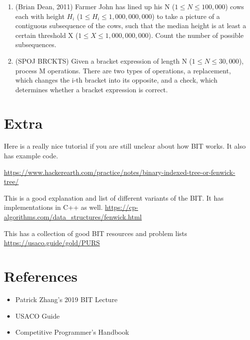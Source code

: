 \documentclass{article}
\begin{document}
\begin{enumerate}
    \item (Brian Dean, 2011) Farmer John has lined up his N ($1 \leq N \leq 100,000$) cows each with height $H_i$ ($1 \leq H_i \leq
1,000,000,000$) to take a picture of a contiguous subsequence of the cows, such that the median height is at
least a certain threshold X ($1 \leq X \leq 1,000,000,000$). Count the number of possible subsequences.

    \item (SPOJ BRCKTS) Given a bracket expression of length N ($1 \leq N \leq 30,000$), process M operations. There are
two types of operations, a replacement, which changes the i-th bracket into its opposite, and a check, which
determines whether a bracket expression is correct.
\end{enumerate} 
        
        
\section{Extra}
Here is a really nice tutorial if you are still unclear about how BIT works. It also has example code.

\noindent\url{https://www.hackerearth.com/practice/notes/binary-indexed-tree-or-fenwick-tree/}

\vspace{5pt}\noindent This is a good explanation and list of different variants of the BIT. It has implementations in C++ as well.
\url{https://cp-algorithms.com/data_structures/fenwick.html}

\vspace{5pt}\noindent This has a collection of good BIT resources and problem lists
\newline\noindent\url{https://usaco.guide/gold/PURS}
\section{References}

\begin{itemize}
    \item Patrick Zhang's 2019 BIT Lecture
    \item USACO Guide
    \item Competitive Programmer's Handbook
\end{itemize}
\end{document}

